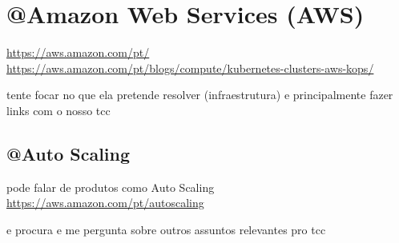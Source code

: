 \chapter{@Amazon Web Services (AWS)}

\url{https://aws.amazon.com/pt/}
\url{https://aws.amazon.com/pt/blogs/compute/kubernetes-clusters-aws-kops/}

tente focar no que ela pretende resolver (infraestrutura) e principalmente
fazer links com o nosso tcc

\section{@Auto Scaling}
pode falar de produtos como Auto Scaling
\url{https://aws.amazon.com/pt/autoscaling}

e procura e me pergunta sobre outros assuntos relevantes pro tcc

